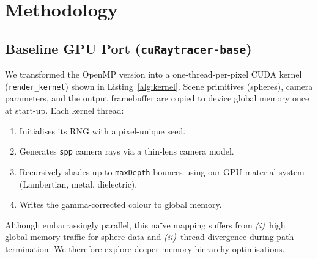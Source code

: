 \section{Methodology}

\subsection{Baseline GPU Port (\texttt{cuRaytracer-base})}
We transformed the OpenMP version into a one-thread-per-pixel CUDA
kernel (\texttt{render\_kernel}) shown in
Listing~\ref{alg:kernel}.  Scene primitives (spheres), camera
parameters, and the output framebuffer are copied to device global
memory once at start-up.  Each kernel thread:

\begin{enumerate}
  \item Initialises its RNG with a pixel-unique seed.
  \item Generates \texttt{spp} camera rays via a thin-lens camera model.
  \item Recursively shades up to \texttt{maxDepth} bounces using
        our GPU material system (Lambertian, metal, dielectric).
  \item Writes the gamma-corrected colour to global memory.
\end{enumerate}



Although embarrassingly parallel, this naïve mapping suffers from
\emph{(i)}~high global-memory traffic for sphere data and
\emph{(ii)}~thread divergence during path termination.  We therefore
explore deeper memory-hierarchy optimisations.

